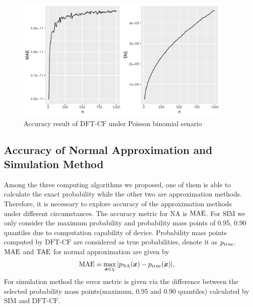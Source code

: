 \documentclass[12pt]{article}
\newcommand{\TAE}{{\rm TAE}}
\newcommand{\MAE}{{\rm MAE}}
\newcommand{\xvec}{\boldsymbol{x}}
\newcommand{\SIM}{{\textrm{SIM}}}
\newcommand{\NA}{{\textrm{NA}}}
\newcommand{\dft}{{\textrm{DFT-CF}}}
\begin{document}
\begin{figure}%
	\centering
	\includegraphics[width=0.95\textwidth]{figures/poib.pdf}
	\caption{Accuracy result of $\dft$ under Poisson binomial senario}
	\label{fig: dft accuracy}
\end{figure}







\subsection{Accuracy of Normal Approximation and Simulation Method}
Among the three computing algorithms we proposed, one of them is able to calculate the exact probability while the other two are approximation methods. Therefore, it is necessary to explore accuracy of the approximation methods under different circumstances. The accuracy metric for $\NA$ is $\MAE$. For $\SIM$ we only consider the maximum probability and probability mass points of 0.95, 0.90 quantiles due to computation capability of device. Probability mass points computed by $\dft$ are considered as true probabilities, denote it as $p_{\rm true}$.
$\MAE$ and $\TAE$ for normal approximation are given by
\begin{equation*}
    \MAE = \max_{\xvec \in \chi}|p_{\NA}(\xvec)-p_{\rm true}(\xvec)|,
\end{equation*}
For simulation method the error metric is given via the difference between the selected probability mass points(maximum, 0.95 and 0.90 quantiles) calculated by $\SIM$ and $\dft$.
\end{document}
